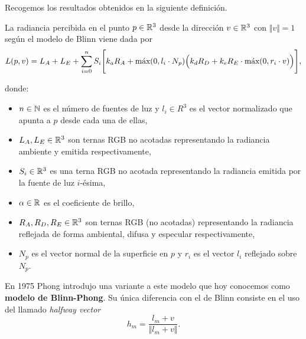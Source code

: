 Recogemos los resultados obtenidos en la siguiente definición.
\begin{definicion}\label{def:blinn} La radiancia percibida en el punto $p\in\R^3$ desde la dirección $v\in\R^3$ con $\Vert v\Vert = 1$ según el modelo de Blinn viene dada por
    \begin{equation*}
        L(p,v) = L_A+L_E+ \sum_{i=0}^n S_i \Bigg[ k_aR_A + \Max(0,l_i\cdot N_p) \Big( k_dR_D + k_eR_E\cdot \Max(0,r_i\cdot v) \Big) \Bigg],
    \end{equation*}

    donde:
    \begin{itemize}
        \item $n \in \N$ es el número de fuentes de luz y $l_i \in R^3$ es el vector normalizado que apunta a $p$ desde cada una de ellas,
        \item $L_A,L_E \in \R^3$ son ternas RGB no acotadas representando la radiancia ambiente y emitida respectivamente,
        \item $S_i \in \R^3$ es una terna RGB no acotada representando la radiancia emitida por la fuente de luz $i$-ésima,
        \item $\alpha \in \R$ es el coeficiente de brillo,
        \item $R_A,R_D,R_E \in \R^3$ son ternas RGB (no acotadas) representando la radiancia reflejada de forma ambiental, difusa y especular respectivamente,
        \item $N_p$ es el vector normal de la superficie en $p$ y $r_i$ es el vector $l_i$ reflejado sobre $N_p$.
    \end{itemize}
\end{definicion}

En 1975 Phong introdujo una variante a este modelo \cite{phong} que hoy conocemos como \textbf{modelo de Blinn-Phong}. Su única diferencia con el de Blinn consiste en el uso del llamado \textit{halfway vector}
\begin{equation*}
    h_m = \frac{l_m + v}{\Vert l_m + v\Vert}.
\end{equation*}


